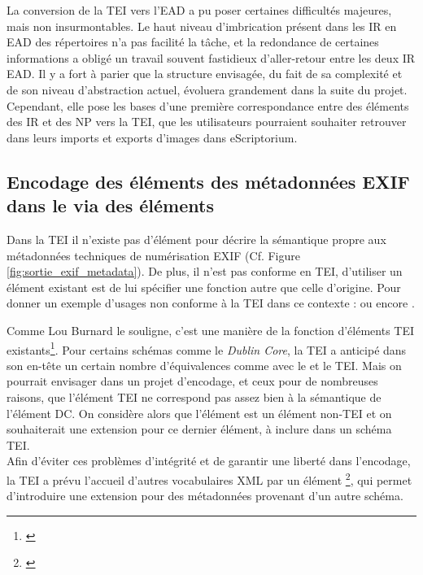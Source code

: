La conversion de la TEI vers l'EAD a pu poser certaines difficultés majeures, mais non insurmontables. Le haut niveau d'imbrication présent dans les IR en EAD des répertoires n'a pas facilité la tâche, et la redondance de certaines informations a obligé un travail souvent fastidieux d'aller-retour entre les deux IR EAD. Il y a fort à parier que la structure envisagée, du fait de sa complexité et de son niveau d'abstraction actuel, évoluera grandement dans la suite du projet. Cependant, elle pose les bases d'une première correspondance entre des éléments des IR et des NP vers la TEI, que les utilisateurs pourraient souhaiter retrouver dans leurs imports et exports d'images dans eScriptorium.

\subsection{Encodage des éléments des métadonnées EXIF dans le  via des éléments }

Dans la TEI il n'existe pas d'élément pour décrire la sémantique propre aux métadonnées techniques de numérisation EXIF (Cf. Figure \ref{fig:sortie_exif_metadata}). De plus, il n'est pas conforme en TEI, d'utiliser un élément existant est de lui spécifier une fonction autre que celle d'origine. Pour donner un exemple d'usages non conforme à la TEI dans ce contexte :  ou encore . 

Comme Lou Burnard le souligne, c'est une manière de  la fonction d'éléments TEI existants\footnote{\cite{burnard_what_2020}}. Pour certains schémas comme le \textit{Dublin Core}, la TEI a anticipé dans son en-tête un certain nombre d'équivalences comme avec le  et le  TEI. Mais on pourrait envisager dans un projet d'encodage, et ceux pour de nombreuses raisons, que l'élément   TEI ne correspond pas assez bien à la sémantique de l'élément DC. On considère alors que l'élément  est un élément non-TEI et on souhaiterait une extension pour ce dernier élément, à inclure dans un schéma TEI.\\

Afin d'éviter ces problèmes d'intégrité et de garantir une liberté dans l'encodage, la TEI a prévu l'accueil d'autres vocabulaires XML par un élément \footnote{\cite{tei_tei_nodate-16}}, qui permet d'introduire une extension pour des métadonnées provenant d'un autre schéma.\\

